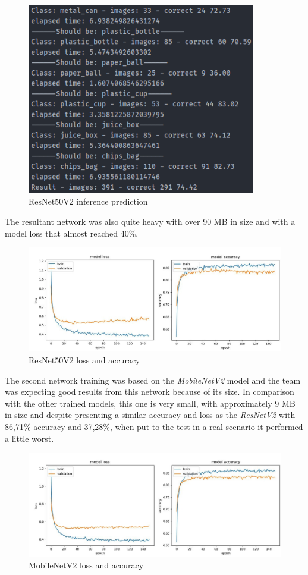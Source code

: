 \documentclass[a4paper,11pt]{article}
\begin{document}
\begin{figure}[H]
  \centering
  \includegraphics[width=10cm]{Figures/ResNet50V2-E150-6C-0-PRED.png}
  \caption{\small{ResNet50V2 inference prediction}}
  \label{fig:resnet}
\end{figure}

The resultant network was also quite heavy with over 90 MB in size and with a model loss that almost reached 40\%.

\begin{figure}[H]
  \centering
  \includegraphics[width=12cm]{Figures/ResNet50V2_Loss_Acc.jpg}
  \caption{\small{ResNet50V2 loss and accuracy}}
  \label{fig:resnetLossAcc}
\end{figure}

The second network training was based on the \textit{MobileNetV2} model and the team was expecting good results from this network because of its size. In comparison with the other trained models, this one is very small, with approximately 9 MB in size and despite presenting a similar accuracy and loss as the \textit{ResNetV2} with 86,71\% accuracy and 37,28\%, when put to the test in a real scenario it performed a little worst.

\begin{figure}[H]
  \centering
  \includegraphics[width=12cm]{Figures/MobileNetV2_Loss_Acc.jpg}
  \caption{\small{MobileNetV2 loss and accuracy}}
  \label{fig:mobilenet}
\end{figure}
\end{document}
